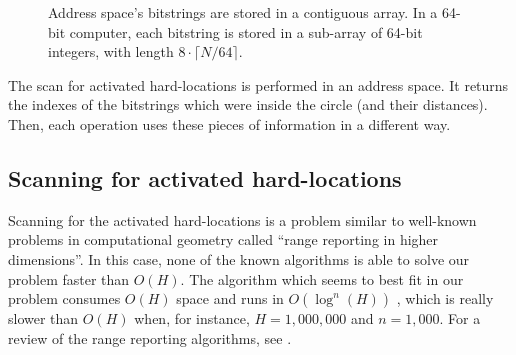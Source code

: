 \begin{figure}
\centering
{}

\caption{Address space's bitstrings are stored in a contiguous array. In a 64-bit computer, each bitstring is stored in a sub-array of 64-bit integers, with length $8 \cdot \lceil N/64 \rceil$.\label{tab:hl-addresses-detail}}
\end{figure}

The scan for activated hard-locations is performed in an address space. It returns the indexes of the bitstrings which were inside the circle (and their distances). Then, each operation uses these pieces of information in a different way.

\subsection{Scanning for activated hard-locations}

Scanning for the activated hard-locations is a problem similar to well-known problems in computational geometry called ``range reporting in higher dimensions''. In this case, none of the known algorithms is able to solve our problem faster than $O(H)$. The algorithm which seems to best fit in our problem consumes $O(H)$ space and runs in $O(\log^n(H))$ \citep{chazelle1988functional}, which is really slower than $O(H)$ when, for instance, $H=1,000,000$ and $n=1,000$. For a review of the range reporting algorithms, see \citet{chan2011orthogonal}.

